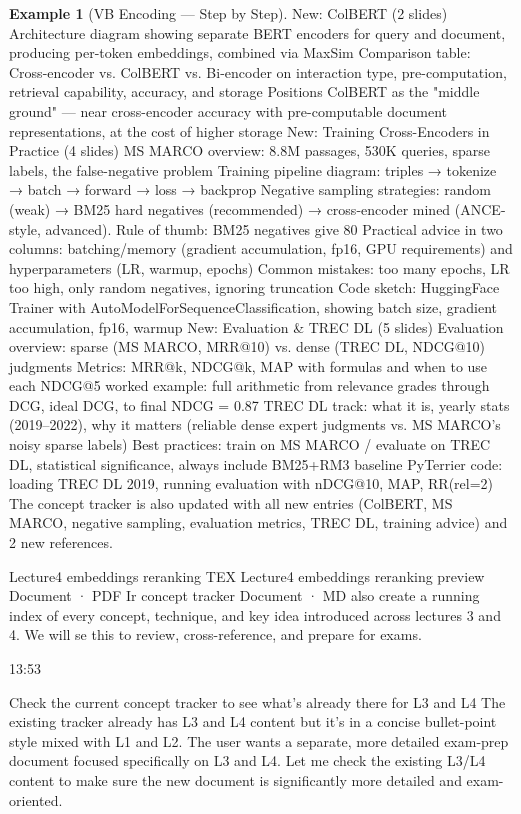\documentclass[aspectratio=169]{beamer} \usetheme{TUDelft} %
\theoremstyle{definition}
\newtheorem{example}{Example}[section]
\theoremstyle{plain}
\begin{document}
\begin{example}[VB Encoding --- Step by Step]
New: ColBERT (2 slides)
Architecture diagram showing separate BERT encoders for query and document, producing per-token embeddings, combined via MaxSim
Comparison table: Cross-encoder vs. ColBERT vs. Bi-encoder on interaction type, pre-computation, retrieval capability, accuracy, and storage
Positions ColBERT as the "middle ground" — near cross-encoder accuracy with pre-computable document representations, at the cost of higher storage
New: Training Cross-Encoders in Practice (4 slides)
MS MARCO overview: 8.8M passages, 530K queries, sparse labels, the false-negative problem
Training pipeline diagram: triples → tokenize → batch → forward → loss → backprop
Negative sampling strategies: random (weak) → BM25 hard negatives (recommended) → cross-encoder mined (ANCE-style, advanced). Rule of thumb: BM25 negatives give 80%
Practical advice in two columns: batching/memory (gradient accumulation, fp16, GPU requirements) and hyperparameters (LR, warmup, epochs)
Common mistakes: too many epochs, LR too high, only random negatives, ignoring truncation
Code sketch: HuggingFace Trainer with AutoModelForSequenceClassification, showing batch size, gradient accumulation, fp16, warmup
New: Evaluation & TREC DL (5 slides)
Evaluation overview: sparse (MS MARCO, MRR@10) vs. dense (TREC DL, NDCG@10) judgments
Metrics: MRR@k, NDCG@k, MAP with formulas and when to use each
NDCG@5 worked example: full arithmetic from relevance grades through DCG, ideal DCG, to final NDCG = 0.87
TREC DL track: what it is, yearly stats (2019–2022), why it matters (reliable dense expert judgments vs. MS MARCO's noisy sparse labels)
Best practices: train on MS MARCO / evaluate on TREC DL, statistical significance, always include BM25+RM3 baseline
PyTerrier code: loading TREC DL 2019, running evaluation with nDCG@10, MAP, RR(rel=2)
The concept tracker is also updated with all new entries (ColBERT, MS MARCO, negative sampling, evaluation metrics, TREC DL, training advice) and 2 new references.

Lecture4 embeddings reranking
TEX 
Lecture4 embeddings reranking preview
Document · PDF 
Ir concept tracker
Document · MD 
also create a running index of every concept, technique, and key idea introduced across lectures 3 and 4. We will se this to review, cross-reference, and prepare for exams.

13:53

Check the current concept tracker to see what's already there for L3 and L4
The existing tracker already has L3 and L4 content but it's in a concise bullet-point style mixed with L1 and L2. The user wants a separate, more detailed exam-prep document focused specifically on L3 and L4. Let me check the existing L3/L4 content to make sure the new document is significantly more detailed and exam-oriented.



\end{example}
\end{document}

